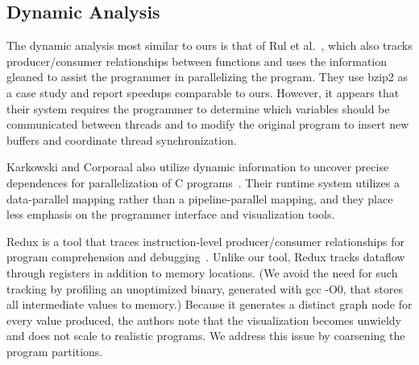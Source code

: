 \subsection*{Dynamic Analysis}

The dynamic analysis most similar to ours is that of Rul et
al.~\cite{rul06functionlevel}, which also tracks producer/consumer
relationships between functions and uses the information gleaned to
assist the programmer in parallelizing the program.  They use bzip2 as
a case study and report speedups comparable to ours.  
However, it appears that their system requires the programmer to
determine which variables should be communicated between threads
and to modify the original program to insert new buffers and
coordinate thread synchronization.

Karkowski and Corporaal also utilize dynamic information to uncover
precise dependences for parallelization of C
programs~\cite{karkowski97overcoming}.  Their runtime system utilizes
a data-parallel mapping rather than a pipeline-parallel mapping, and
they place less emphasis on the programmer interface and visualization
tools.


%
%

Redux is a tool that traces instruction-level producer/consumer
relationships for program comprehension and
debugging~\cite{nethercote03redux}.
Unlike our tool, Redux tracks dataflow through registers in addition
to memory locations.  (We avoid the need for such tracking by
profiling an unoptimized binary, generated with gcc -O0, that stores
all intermediate values to memory.)  Because it generates a distinct
graph node for every value produced, the authors note that the
visualization becomes unwieldy and does not scale to realistic
programs.  We address this issue by coarsening the program partitions.

